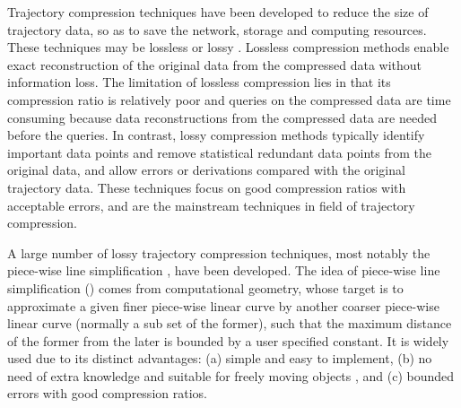Trajectory compression techniques \cite{Douglas:Peucker, Hershberger:Speeding, Meratnia:Spatiotemporal, Liu:BQS, Muckell:Compression, Chen:Trajectory, Chen:Fast, Keogh:online, Cao:Spatio, Shi:Survey, Richter:Semantic ,Long:Direction, Song:PRESS, Nibali:Trajic} have been developed to reduce the size of trajectory data, so as to save the network, storage and computing resources.
%
%
%
%
These techniques may be lossless or lossy \cite{Muckell:Compression}.
Lossless compression methods enable exact reconstruction of the original data from the compressed data without information loss. 
The limitation of lossless compression lies in that its compression ratio is relatively poor \cite{Nibali:Trajic} and {queries on the compressed data are time consuming because data reconstructions from the compressed data are needed before the queries}.
%
In contrast, lossy compression methods typically identify important data points and remove statistical redundant data points from the original data, and allow errors or derivations compared with the original trajectory data. 
These techniques focus on good compression ratios with acceptable errors, and are the mainstream techniques in field of trajectory compression.

A large number of lossy trajectory compression techniques, most notably the piece-wise line simplification \cite{Douglas:Peucker, Hershberger:Speeding, Keogh:online,Liu:BQS, Muckell:Compression, Chen:Trajectory, Chen:Fast, Cao:Spatio, Shi:Survey}, have been developed. The idea of piece-wise line simplification (\lsa) comes from computational geometry, whose target is to approximate a given finer piece-wise linear curve by another coarser piece-wise linear curve ({normally} a sub set of the former), such that the maximum distance of the former from the later is bounded by a user specified constant. It is widely used due to its distinct advantages: (a) simple and easy to implement, (b) no need of extra knowledge and suitable for freely  moving  objects \cite{Popa:Spatio}, and (c) bounded errors with good compression ratios.


